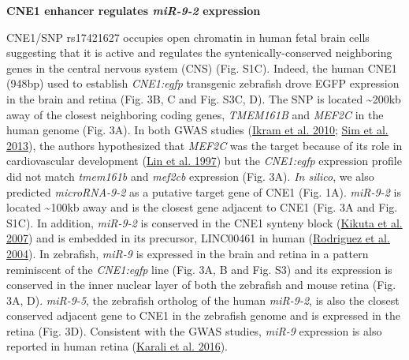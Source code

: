\documentclass[]{article}
\begin{document}
\textbf{CNE1 enhancer regulates \emph{miR-9-2} expression}

CNE1/SNP rs17421627 occupies open chromatin in human fetal brain cells
suggesting that it is active and regulates the syntenically-conserved
neighboring genes in the central nervous system (CNS) (Fig. S1C).
Indeed, the human CNE1 (948bp) used to establish \emph{CNE1:egfp}
transgenic zebrafish drove EGFP expression in the brain and retina (Fig.
3B, C and Fig. S3C, D). The SNP is located \textasciitilde{}200kb away
of the closest neighboring coding genes, \emph{TMEM161B} and
\emph{MEF2C} in the human genome (Fig. 3A). In both GWAS studies
(\protect\hyperlink{_ENREF_9}{Ikram et al. 2010};
\protect\hyperlink{_ENREF_29}{Sim et al. 2013}), the authors
hypothesized that \emph{MEF2C} was the target because of its role in
cardiovascular development (\protect\hyperlink{_ENREF_17}{Lin et al.
1997}) but the \emph{CNE1:egfp} expression profile did not match
\emph{tmem161b} and \emph{mef2cb} expression (Fig. 3A). \emph{In
silico}, we also predicted \emph{microRNA-9-2} as a putative target gene
of CNE1 (Fig. 1A). \emph{miR-9-2} is located \textasciitilde{}100kb away
and is the closest gene adjacent to CNE1 (Fig. 3A and Fig. S1C). In
addition, \emph{miR-9-2} is conserved in the CNE1 synteny block
(\protect\hyperlink{_ENREF_13}{Kikuta et al. 2007}) and is embedded in
its precursor, LINC00461 in human
(\protect\hyperlink{_ENREF_25}{Rodriguez et al. 2004}). In zebrafish,
\emph{miR-9} is expressed in the brain and retina in a pattern
reminiscent of the \emph{CNE1:egfp} line (Fig. 3A, B and Fig. S3) and
its expression is conserved in the inner nuclear layer of both the
zebrafish and mouse retina (Fig. 3A, D). \emph{miR-9-5}, the zebrafish
ortholog of the human \emph{miR-9-2}, is also the closest conserved
adjacent gene to CNE1 in the zebrafish genome and is expressed in the
retina (Fig. 3D). Consistent with the GWAS studies, \emph{miR-9}
expression is also reported in human retina
(\protect\hyperlink{_ENREF_11}{Karali et al. 2016}).
\end{document}
